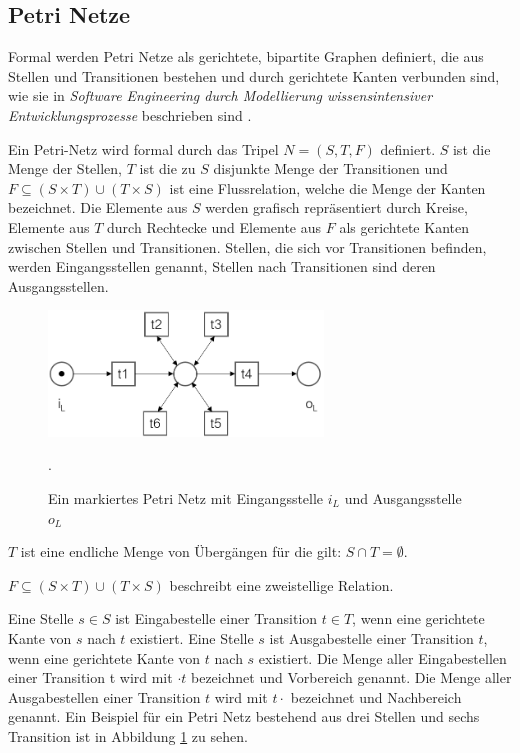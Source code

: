 \subsection{Petri Netze}
Formal werden Petri Netze als gerichtete, bipartite Graphen definiert, die aus Stellen  und  Transitionen  bestehen und durch  gerichtete  Kanten  verbunden sind, wie sie in \textit{Software Engineering durch Modellierung wissensintensiver Entwicklungsprozesse} beschrieben sind \cite{freund2007software}. 

Ein Petri-Netz wird formal durch das Tripel $N = (S, T, F)$ definiert. $S$ ist die Menge der Stellen, $T$  ist  die  zu  $S$  disjunkte  Menge  der  Transitionen  und  $F⊆ (S ×  T) ∪ (T  ×  S) $ ist  eine Flussrelation,  welche  die  Menge  der  Kanten  bezeichnet.  Die  Elemente  aus  $S$  werden grafisch repräsentiert durch Kreise, Elemente aus $T$ durch Rechtecke und Elemente aus $F$ als gerichtete Kanten zwischen Stellen und Transitionen. Stellen,  die  sich  vor  Transitionen  befinden, werden Eingangsstellen genannt, Stellen nach Transitionen sind deren Ausgangsstellen. 

\begin{figure}[!h]
    \centering
    \includegraphics[width=0.65\textwidth]{figures/Appbildungen/petriNetFlower.png}
    \caption{Ein markiertes Petri Netz mit Eingangsstelle $i_L$ und Ausgangsstelle $o_L$}.
    \label{fig:exampleFlower}
\end{figure}

$T$ ist eine endliche Menge von Übergängen für die gilt: $S ∩ T =  ∅.$

$F ⊆(S × T) ∪ (T × S)$ beschreibt eine zweistellige Relation.

Eine  Stelle  $s∈S$  ist  Eingabestelle  einer  Transition  $t∈T$,  wenn  eine  gerichtete  Kante  von $s$ nach $t$ existiert. Eine Stelle $s$ ist Ausgabestelle einer Transition $ t$, wenn eine gerichtete Kante von $t$ nach $s$ existiert. Die Menge aller Eingabestellen einer Transition t wird mit $\cdot t$ bezeichnet und Vorbereich genannt. Die Menge aller Ausgabestellen einer Transition $t$ wird mit $t \cdot$ bezeichnet und Nachbereich genannt. Ein Beispiel für ein Petri Netz bestehend aus drei Stellen und sechs Transition ist in Abbildung \ref{fig:exampleFlower} zu sehen.

